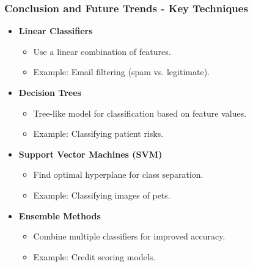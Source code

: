 \documentclass{beamer}
\begin{document}
\begin{frame}[fragile]
    \frametitle{Conclusion and Future Trends - Key Techniques}
    \begin{itemize}
        \item \textbf{Linear Classifiers}
            \begin{itemize}
                \item Use a linear combination of features.
                \item Example: Email filtering (spam vs. legitimate).
            \end{itemize}
        \item \textbf{Decision Trees}
            \begin{itemize}
                \item Tree-like model for classification based on feature values.
                \item Example: Classifying patient risks.
            \end{itemize}
        \item \textbf{Support Vector Machines (SVM)}
            \begin{itemize}
                \item Find optimal hyperplane for class separation.
                \item Example: Classifying images of pets.
            \end{itemize}
        \item \textbf{Ensemble Methods}
            \begin{itemize}
                \item Combine multiple classifiers for improved accuracy.
                \item Example: Credit scoring models.
            \end{itemize}
    \end{itemize}
\end{frame}
\end{document}
